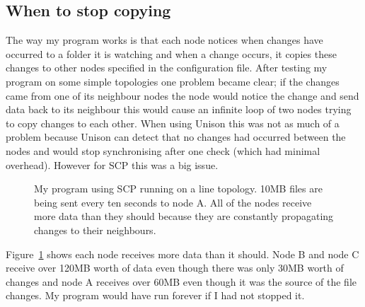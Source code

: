 \documentclass[12pt]{article}
\begin{document}
\subsection{When to stop copying}
The way my program works is that each node notices when changes
have occurred to a folder it is watching and when a change occurs,
it copies these changes to other nodes specified in the configuration
file.
After testing my program on some simple topologies one problem became
clear; if the changes
came from one of its neighbour nodes the node would notice the change
and send data back to its neighbour this would cause an infinite loop
of two nodes trying to copy changes to each other.
When using Unison this was not as much of
a problem because Unison can detect that no changes had occurred between the nodes
and would stop synchronising after one check (which had minimal overhead). However
for SCP this was a big issue.

\begin{figure}[htp]
    \caption{My program using SCP running on a line topology.
    10MB files are being sent every ten seconds to node A. 
    All of the nodes receive more data than they should
    because they are constantly propagating changes to their
    neighbours.}
    \label{fig:line_scp_back_forth_graph}
\end{figure}

Figure~\ref{fig:line_scp_back_forth_graph} shows each node receives
more data than it should. Node B and node C receive over 120MB worth of
data even though there was only 30MB worth of changes and node A
receives over 60MB even though it was the source
of the file changes. My program would have run forever if I had not
stopped it.
\end{document}

